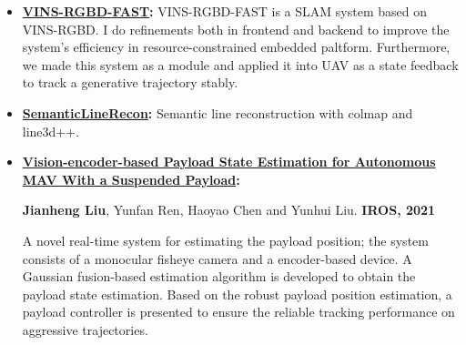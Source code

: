 \documentclass[11pt,a4paper,sans]{moderncv}        %
\begin{document}
\begin{itemize}
\item \textbf{\href{https://github.com/jianhengLiu/VINS-RGBD-FAST}{VINS-RGBD-FAST}:} VINS-RGBD-FAST is a SLAM system based on VINS-RGBD. I do refinements both in frontend and backend to improve the system's efficiency in resource-constrained embedded paltform. Furthermore, we made this system as a module and applied it into UAV as a state feedback to track a generative trajectory stably. 


\item \textbf{\href{https://github.com/jianhengLiu/SV-SLAM}{SemanticLineRecon}:} Semantic line reconstruction with colmap and line3d++.


\item \textbf{\href{https://github.com/jianhengLiu/Vision-encoder-based-Payload-State-Estimator}{Vision-encoder-based Payload State Estimation for Autonomous MAV With a Suspended Payload}:} 

\textbf{Jianheng Liu}, Yunfan Ren, Haoyao Chen and Yunhui Liu. \textbf{IROS, 2021}

A novel real-time system for estimating the payload position; the system consists of a monocular fisheye camera and a encoder-based device. A Gaussian fusion-based estimation algorithm is developed to obtain the payload state estimation. Based on the robust payload position estimation, a payload controller is presented to ensure the reliable tracking performance on aggressive trajectories.



\end{itemize}
\end{document}
